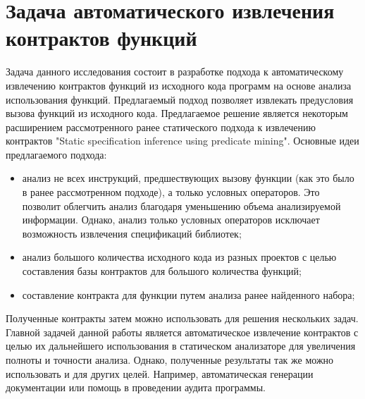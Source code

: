 \section{Задача автоматического извлечения контрактов функций}
Задача данного исследования состоит в разработке подхода к автоматическому извлечению контрактов функций из исходного кода программ на основе анализа использования функций. Предлагаемый подход позволяет извлекать предусловия вызова функций из исходного кода. Предлагаемое решение является некоторым расширением рассмотренного ранее статического подхода к извлечению контрактов "Static specification inference using predicate mining"\cite{staticPredicateMining}. Основные идеи предлагаемого подхода:
\begin{itemize}
\item анализ не всех инструкций, предшествующих вызову функции (как это было в ранее рассмотренном подходе), а только условных операторов. Это позволит облегчить анализ благодаря уменьшению объема анализируемой информации. Однако, анализ только условных операторов исключает возможность извлечения спецификаций библиотек;
\item анализ большого количества исходного кода из разных проектов с целью составления базы контрактов для большого количества функций;
\item составление контракта для функции путем анализа ранее найденного набора;
\end{itemize}

Полученные контракты затем можно использовать для решения нескольких задач. Главной задачей данной работы является автоматическое извлечение контрактов с целью их дальнейшего использования в статическом анализаторе для увеличения полноты и точности анализа. Однако, полученные результаты так же можно использовать и для других целей. Например, автоматическая генерации документации или помощь в проведении аудита программы.

